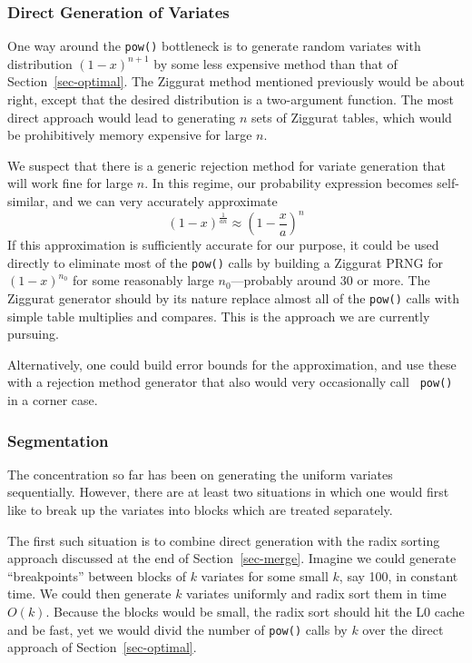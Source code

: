\documentclass[12pt]{article}
\begin{document}
\subsubsection{Direct Generation of Variates}

  One way around the {\tt pow()} bottleneck is to generate
  random variates with distribution $(1 - x)^{n + 1}$ by
  some less expensive method than that of
  Section~\ref{sec-optimal}.  The Ziggurat method mentioned
  previously would be about right, except that the desired
  distribution is a two-argument function.  The most direct
  approach would lead to generating $n$ sets of Ziggurat
  tables, which would be prohibitively memory expensive for
  large $n$.

  We suspect that there is a generic rejection method for
  variate generation that will work fine for large $n$. In
  this regime, our probability expression becomes
  self-similar, and we can very accurately approximate $$
    (1 - x)^{\frac{1}{an}} \approx \left(1 - \frac{x}{a}\right)^n
  $$
  If this approximation is sufficiently accurate for our
  purpose, it could be used directly to eliminate most
  of the {\tt pow()} calls by building a Ziggurat PRNG for
  $(1-x)^{n_0}$ for some reasonably large $n_0$---probably
  around 30 or more.  The Ziggurat generator should by its
  nature replace almost all of the {\tt pow()} calls with
  simple table multiplies and compares.  This is the
  approach we are currently pursuing.

  Alternatively, one could build error bounds for the
  approximation, and use these with a rejection method
  generator that also would very occasionally call {\tt
  pow()} in a corner case.

\subsubsection{Segmentation}\label{sec-segment}

  The concentration so far has been on generating the
  uniform variates sequentially.  However, there are at
  least two situations in which one would first like to
  break up the variates into blocks which are treated
  separately.

  The first such situation is to combine direct generation
  with the radix sorting approach discussed at the end of
  Section~\ref{sec-merge}.  Imagine we could generate
  ``breakpoints'' between blocks of $k$ variates for some
  small $k$, say 100, in constant time.  We could then
  generate $k$ variates uniformly and radix sort them in
  time $O(k)$.  Because the blocks would be small, the radix
  sort should hit the L0 cache and be fast, yet we would
  divid the number of {\tt pow()} calls by $k$ over the
  direct approach of Section~\ref{sec-optimal}.
\end{document}
